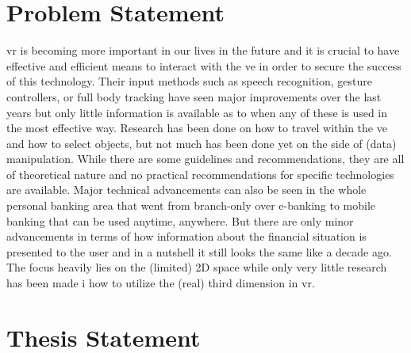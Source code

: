 
\section{Problem Statement}

\gls{vr} is becoming more important in our lives in the future and it is crucial to have effective and efficient means to interact with the \gls{ve} in order to secure the success of this technology. Their input methods such as speech recognition, gesture controllers, or full body tracking have seen major improvements over the last years but only little information is available as to when any of these is used in the most effective way. Research has been done on how to travel within the \gls{ve} and how to select objects, but not much has been done yet on the side of (data) manipulation. While there are some guidelines and recommendations, they are all of theoretical nature and no practical recommendations for specific technologies are available.\newline
Major technical advancements can also be seen in the whole personal banking area that went from branch-only over e-banking to mobile banking that can be used anytime, anywhere. But there are only minor advancements in terms of how information about the financial situation is presented to the user and in a nutshell it still looks the same like a decade ago. The focus heavily lies on the (limited) 2D space while only very little research has been made i how to utilize the (real) third dimension in \gls{vr}.



\section{Thesis Statement}

\newcommand{\thesisstatementtext}{Exploratory analysis of categorized financial data can be enhanced by utilizing state-of-the-art input methods and interaction patterns in virtual reality.}

\label{TS}

